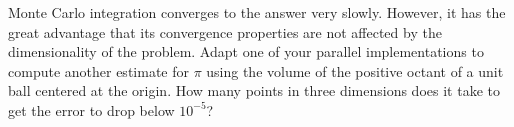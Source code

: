 \begin{questions}

\question Monte Carlo integration converges to the answer very slowly. However, it has the
great advantage that its convergence properties are not affected by the dimensionality of the
problem. Adapt one of your parallel implementations to compute another estimate for $\pi$ using
the volume of the positive octant of a unit ball centered at the origin. How many points in
three dimensions does it take to get the error to  drop below $10^{-5}$?

\end{questions}

